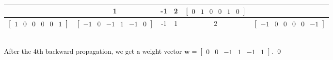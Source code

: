 \documentclass[12pt]{article}
\begin{document}
\begin{enumerate}[label=(\alph*)]
\begin{tabular}{||c|c|c|c|c|c||}
          & 1 & -1 & 2 &
          $\begin{bmatrix}
            0 & 1 & 0 & 0 & 1 & 0
          \end{bmatrix}$ \\
        \hline
          $\begin{bmatrix}
            1 & 0 & 0 & 0 & 0 & 1
          \end{bmatrix}$
          &
          $\begin{bmatrix}
            -1 & 0 & -1 & 1 & -1 & 0
          \end{bmatrix}$
          & -1 & 1 & 2 &
          $\begin{bmatrix}
            -1 & 0 & 0 & 0 & 0 & -1
          \end{bmatrix}$ \\
        \hline
      \end{tabular}\\
    After the 4th backward propagation, we get a weight vector
    $ \mathbf{w} = 
    \begin{bmatrix}
      0 & 0 & -1 & 1 & -1 & 1
    \end{bmatrix}$. \qed
  

\end{enumerate}
\end{document}
